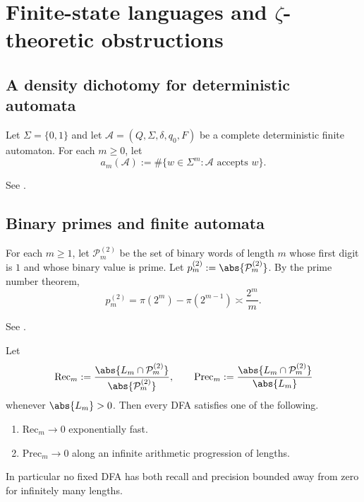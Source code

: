 \section{Finite-state languages and \texorpdfstring{$\zeta$}{zeta}-theoretic obstructions}
\label{sec:syntax-zeta}

\subsection{A density dichotomy for deterministic automata}

Let $\Sigma=\{0,1\}$ and let
$\mathcal A=(Q,\Sigma,\delta,q_0,F)$ be a complete deterministic
finite automaton. For each $m\ge 0$, let
\[
  a_m(\mathcal A)
  :=\#\{w\in\Sigma^m:\mathcal A\text{ accepts }w\}.
\]

\begin{theorem}
  \label{thm:dfa-density-dichotomy}
  See \cite[Theorem~2.2]{MaZhang2026PrimeLanguageObstructions}.
\end{theorem}

\subsection{Binary primes and finite automata}

For each $m\ge 1$, let $\mathcal P_m^{(2)}$ be the set of binary words
of length $m$ whose first digit is $1$ and whose binary value is
prime. Let $p_m^{(2)}:=\abs{\mathcal P_m^{(2)}}$. By the prime number
theorem,
\[
  p_m^{(2)}
  =\pi(2^m)-\pi(2^{m-1})
  \asymp \frac{2^m}{m}.
\]

\begin{corollary}
  \label{cor:dfa-prime-symmetric-diff}
  See \cite[Corollary~2.5]{MaZhang2026PrimeLanguageObstructions}.
\end{corollary}

\begin{corollary}
  \label{cor:dfa-prime-recall-precision}
  Let
  \[
    \mathrm{Rec}_m
    :=\frac{\abs{L_m\cap\mathcal P_m^{(2)}}}{\abs{\mathcal P_m^{(2)}}},
    \qquad
    \mathrm{Prec}_m
    :=\frac{\abs{L_m\cap\mathcal P_m^{(2)}}}{\abs{L_m}}
  \]
  whenever $\abs{L_m}>0$. Then every DFA satisfies one of the
  following.
  \begin{enumerate}[label=\textup{(\roman*)}]
    \item $\mathrm{Rec}_m\to 0$ exponentially fast.
    \item $\mathrm{Prec}_m\to 0$ along an infinite arithmetic
    progression of lengths.
  \end{enumerate}
  In particular no fixed DFA has both recall and precision bounded
  away from zero for infinitely many lengths.
\end{corollary}

